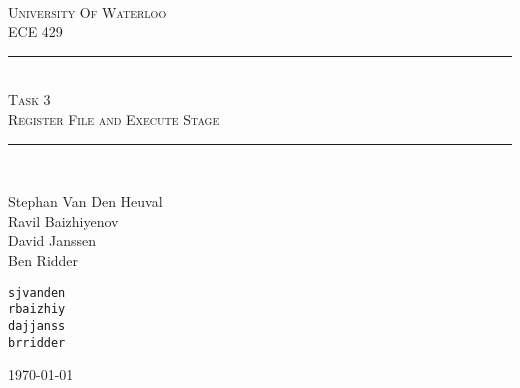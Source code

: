 \begin{titlepage}
\begin{center}
\vfill
\hfill
\\[2cm]
\textsc{\LARGE University Of Waterloo}
\\[1cm]
\textsc{\LARGE ECE 429}
\\[2cm]

\hrule
\hfill
\\[0.5cm]
\textsc{\huge Task 3}
\\[0.5cm]
\textsc{\huge Register File and Execute Stage}
\\[0.5cm]
\hrule
\hfill
\\[1cm]

\begin{minipage}{0.4\textwidth}
\begin{flushleft} \large
Stephan Van Den Heuval \\
Ravil Baizhiyenov \\
David Janssen \\
Ben Ridder
\end{flushleft}
\end{minipage}
\begin{minipage}{0.4\textwidth}
\begin{flushright} \large
\texttt{sjvanden} \\
\texttt{rbaizhiy} \\
\texttt{dajjanss} \\
\texttt{brridder} 
\end{flushright}
\end{minipage}


\vfill

{\large \today}
\end{center}
\end{titlepage}
